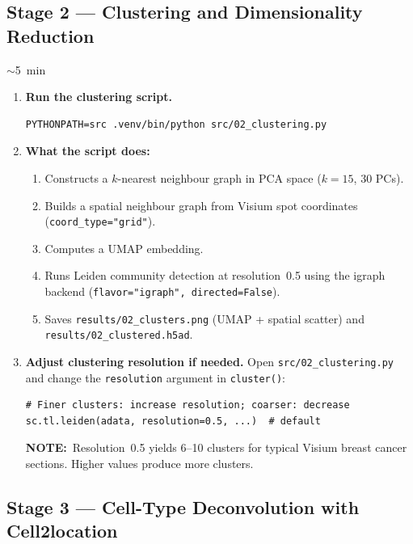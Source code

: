 \documentclass[12pt, a4paper]{article}
\newcommand{\notepar}[1]{\par\smallskip\noindent%
    {\bfseries NOTE:}\ #1\par\smallskip}
\newcommand{\timing}[1]{%
    \begin{tcolorbox}[colback=orange!7,colframe=orange!55!black,
        fonttitle=\bfseries\small,title=Timing,
        boxrule=0.5pt,left=4pt,right=4pt,top=2pt,bottom=2pt,
        before upper=\small]
    #1
    \end{tcolorbox}\vspace{2pt}}
\begin{document}
\subsection{Stage 2 — Clustering and Dimensionality Reduction}

\timing{$\sim$5~min}

\begin{enumerate}

\item \textbf{Run the clustering script.}
\begin{lstlisting}
PYTHONPATH=src .venv/bin/python src/02_clustering.py
\end{lstlisting}

\item \textbf{What the script does:}
\begin{enumerate}
    \item Constructs a $k$-nearest neighbour graph in PCA space
          ($k=15$, 30 PCs).
    \item Builds a spatial neighbour graph from Visium spot
          coordinates (\texttt{coord\_type="grid"}).
    \item Computes a UMAP embedding.
    \item Runs Leiden community detection at resolution~0.5 using the
          igraph backend (\texttt{flavor="igraph",
          directed=False}).
    \item Saves \texttt{results/02\_clusters.png} (UMAP + spatial
          scatter) and \texttt{results/02\_clustered.h5ad}.
\end{enumerate}

\item \textbf{Adjust clustering resolution if needed.}
Open \texttt{src/02\_clustering.py} and change the \texttt{resolution}
argument in \texttt{cluster()}:
\begin{lstlisting}[style=python]
# Finer clusters: increase resolution; coarser: decrease
sc.tl.leiden(adata, resolution=0.5, ...)  # default
\end{lstlisting}
\notepar{Resolution~0.5 yields 6--10 clusters for typical Visium
breast cancer sections.  Higher values produce more clusters.}

\end{enumerate}

\subsection{Stage 3 — Cell-Type Deconvolution with Cell2location}
\end{document}
